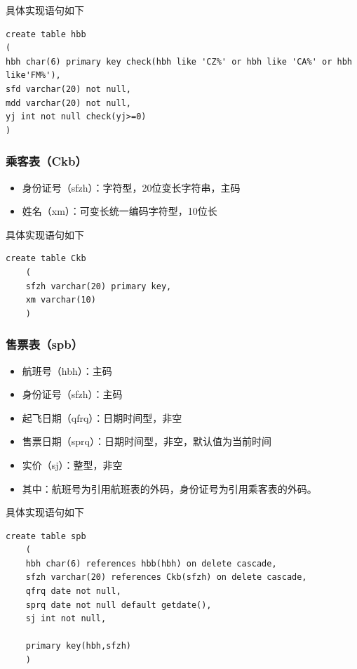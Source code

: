 \documentclass[UTF8,12pt]{article}
\begin{document}
具体实现语句如下
\begin{lstlisting}[title=DDL创建航班表,frame=shadowbox]
    create table hbb
(
hbh char(6) primary key check(hbh like 'CZ%' or hbh like 'CA%' or hbh like'FM%'),
sfd varchar(20) not null,
mdd varchar(20) not null,
yj int not null check(yj>=0)
)
\end{lstlisting}

\subsubsection{乘客表（Ckb）}
\begin{itemize}
    \item 身份证号（sfzh）：字符型，20位变长字符串，主码
    \item 姓名（xm）：可变长统一编码字符型，10位长
\end{itemize}

具体实现语句如下
\begin{lstlisting}[title=DDL创建乘客表,frame=shadowbox]
    create table Ckb
    (
    sfzh varchar(20) primary key,
    xm varchar(10)
    )
\end{lstlisting}

\subsubsection{售票表（spb）}
\begin{itemize}
    \item 航班号（hbh）：主码 
    \item 身份证号（sfzh）：主码
    \item 起飞日期（qfrq）：日期时间型，非空
    \item 售票日期（sprq）：日期时间型，非空，默认值为当前时间
    \item 实价（sj）：整型，非空
    \item 其中：航班号为引用航班表的外码，身份证号为引用乘客表的外码。
\end{itemize}

具体实现语句如下
\begin{lstlisting}[title=DDL创建售票表,frame=shadowbox]
    create table spb
    (
    hbh char(6) references hbb(hbh) on delete cascade,
    sfzh varchar(20) references Ckb(sfzh) on delete cascade,
    qfrq date not null,
    sprq date not null default getdate(),
    sj int not null,
    
    primary key(hbh,sfzh)
    )
\end{lstlisting}
\end{document}
